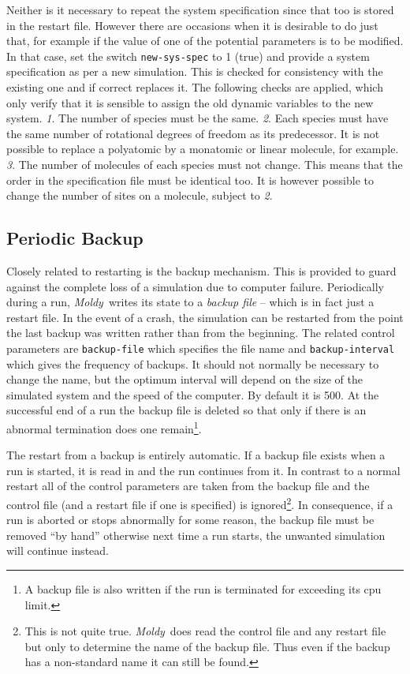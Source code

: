 \documentclass[twoside]{report}
\newcommand{\moldy}{{\em Moldy}}
\begin{document}
Neither is it necessary to repeat the system specification since that
too is stored in the restart file.  However there are occasions
when it is desirable to do just that, for example if the value of one
of the potential parameters is to be modified.  In that case, set the
switch \texttt{new-sys-spec} to 1 (true) and provide a system
specification as per a new simulation.  This is checked for
consistency with the existing one and if correct replaces it.  The
following checks are applied, which only verify that it is sensible to
assign the old dynamic variables to the new system. {\em 1}. The
number of species must be the same. {\em 2}. Each species must have
the same number of rotational degrees of freedom as its predecessor.
It is not possible to replace a polyatomic by a monatomic or
linear molecule, for example.  {\em 3}. The number of molecules of
each species must not change.  This means that the order in the
specification file must be identical too.  It is however possible to
change the number of sites on a molecule, subject to {\em 2}.

\subsection{Periodic Backup}
\label{sec:backup}
Closely related to restarting is the backup mechanism.  This is
provided to guard against the complete loss of a simulation due to
computer failure. Periodically during a run, \moldy\  writes its state
to a {\em backup file\/} -- which is in fact just a restart file.  In
the event of a crash, the simulation can be restarted from the point
the last backup was written rather than from the beginning. The
related control parameters are \texttt{backup-file} which specifies the
file name and \texttt{backup-interval} which gives the frequency of
backups.  It should not normally be necessary to change the name, but
the optimum interval will depend on the size of the simulated system
and the speed of the computer. By default it is 500.  At the
successful end of a run the backup file is deleted so that only if
there is an abnormal termination does one remain\footnote{A backup
file is also written if the run is terminated for exceeding its cpu
limit.}.

The restart from a backup is entirely automatic. If a backup file
exists when a run is started, it is read in and the run continues from
it.  In contrast to a normal restart all of the control parameters are
taken from the backup file and the control file (and a restart file if
one is specified) is ignored\footnote{This is not quite true. \moldy\
does read the control file and any restart file but only to determine
the name of the backup file. Thus even if the backup has a
non-standard name it can still be found.}.  In consequence, if a run
is aborted or stops abnormally for some reason, the backup file must
be removed ``by hand'' otherwise next time a run starts, the unwanted
simulation will continue instead.
\end{document}
